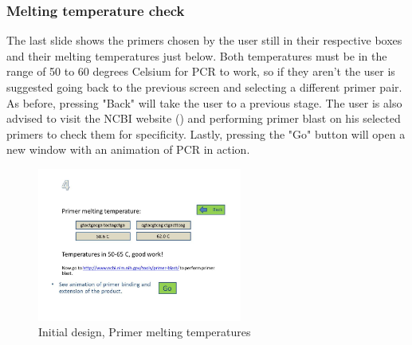 \subsubsection{Melting temperature check}
The last slide shows the primers chosen by the user still in their respective boxes and their melting temperatures just below. Both temperatures must be in the range of 50 to 60 degrees Celsium for PCR to work, so if they aren't the user is suggested going back to the previous screen and selecting a different primer pair. As before, pressing "Back" will take the user to a previous stage. The user is also advised to visit the NCBI website (\cite{ncbi}) and performing primer blast on his selected primers to check them for specificity. Lastly, pressing the "Go" button will open a new window with an animation of PCR in action.

\begin{figure}[h]
  \begin{center}
	\includegraphics[width=0.6\textwidth]{./images/UiDes/Slide6.jpg}
    \caption{
      \label{fig:UiDes:slide6}
      Initial design, Primer melting temperatures
    }
  \end{center}
\end{figure}

